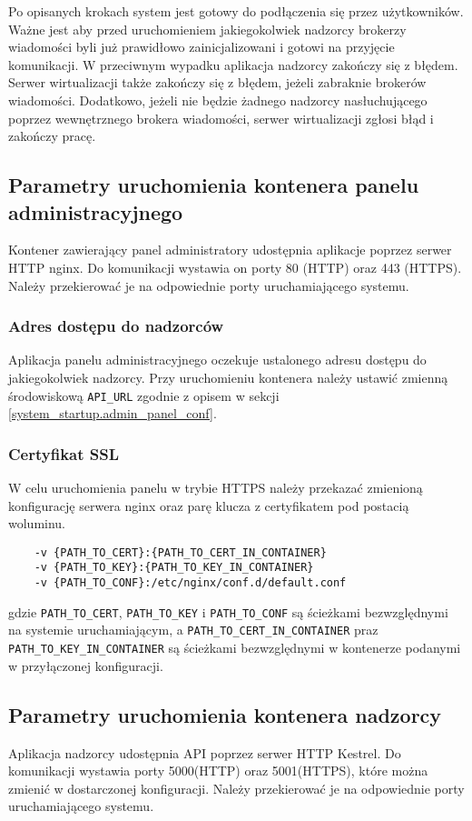 \documentclass[../opis-rozwiazania.tex]{subfiles}
\begin{document}
Po opisanych krokach system jest gotowy do podłączenia się przez użytkowników.
Ważne jest aby przed uruchomieniem jakiegokolwiek nadzorcy brokerzy wiadomości byli już prawidłowo zainicjalizowani i gotowi na przyjęcie komunikacji.
W przeciwnym wypadku aplikacja nadzorcy zakończy się z błędem.
Serwer wirtualizacji także zakończy się z błędem, jeżeli zabraknie brokerów wiadomości.
Dodatkowo, jeżeli nie będzie żadnego nadzorcy nasłuchującego poprzez wewnętrznego brokera wiadomości, serwer wirtualizacji zgłosi błąd i zakończy pracę.

\subsection{Parametry uruchomienia kontenera panelu administracyjnego}
Kontener zawierający panel administratory udostępnia aplikacje poprzez serwer HTTP nginx.
Do komunikacji wystawia on porty 80 (HTTP) oraz 443 (HTTPS).
Należy przekierować je na odpowiednie porty uruchamiającego systemu.

\subsubsection{Adres dostępu do nadzorców}
Aplikacja panelu administracyjnego oczekuje ustalonego adresu dostępu do jakiegokolwiek nadzorcy.
Przy uruchomieniu kontenera należy ustawić zmienną środowiskową \texttt{API\_URL} zgodnie z opisem w sekcji \ref{system_startup.admin_panel_conf}.

\subsubsection{Certyfikat SSL}
W celu uruchomienia panelu w trybie HTTPS należy przekazać zmienioną konfigurację serwera nginx oraz parę klucza z certyfikatem pod postacią woluminu.
\begin{verbatim}
	-v {PATH_TO_CERT}:{PATH_TO_CERT_IN_CONTAINER}
	-v {PATH_TO_KEY}:{PATH_TO_KEY_IN_CONTAINER}
	-v {PATH_TO_CONF}:/etc/nginx/conf.d/default.conf
\end{verbatim}
gdzie \texttt{PATH\_TO\_CERT}, \texttt{PATH\_TO\_KEY} i \texttt{PATH\_TO\_CONF} są ścieżkami bezwzględnymi na systemie uruchamiającym, a \texttt{PATH\_TO\_CERT\_IN\_CONTAINER} praz \texttt{PATH\_TO\_KEY\_IN\_CONTAINER} są ścieżkami bezwzględnymi w kontenerze podanymi w przyłączonej konfiguracji.

\subsection{Parametry uruchomienia kontenera nadzorcy}
Aplikacja nadzorcy udostępnia API poprzez serwer HTTP Kestrel.
Do komunikacji wystawia porty 5000(HTTP) oraz 5001(HTTPS), które można zmienić w dostarczonej konfiguracji.
Należy przekierować je na odpowiednie porty uruchamiającego systemu.
\end{document}
